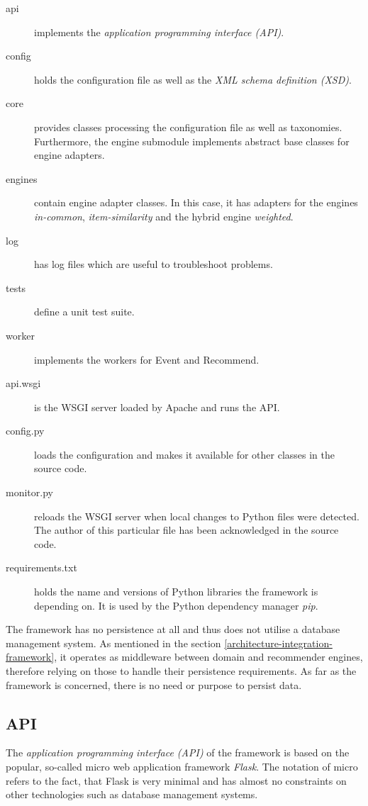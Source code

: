 \begin{description}
    \item[api] implements the \emph{application programming interface (API)}.
    \item[config] holds the configuration file as well as the \emph{XML schema definition (XSD)}.
    \item[core] provides classes processing the configuration file as well as taxonomies. Furthermore, the engine submodule implements abstract base classes for engine adapters.
    \item[engines] contain engine adapter classes. In this case, it has adapters for the engines \emph{in-common}, \emph{item-similarity} and the hybrid engine \emph{weighted}.
    \item[log] has log files which are useful to troubleshoot problems.
    \item[tests] define a unit test suite.
    \item[worker] implements the workers for Event and Recommend.
    \item[api.wsgi] is the WSGI server loaded by Apache and runs the API.
    \item[config.py] loads the configuration and makes it available for other classes in the source code.
    \item[monitor.py] reloads the WSGI server when local changes to Python files were detected. The author of this particular file has been acknowledged in the source code.
    \item[requirements.txt] holds the name and versions of Python libraries the framework is depending on. It is used by the Python dependency manager \emph{pip}.
\end{description}

The framework has no persistence at all and thus does not utilise a database management system. As mentioned in the section \ref{architecture-integration-framework}, it operates as middleware between domain and recommender engines, therefore relying on those to handle their persistence requirements. As far as the framework is concerned, there is no need or purpose to persist data.

\subsection{API}

The \emph{application programming interface (API)} of the framework is based on the popular, so-called micro web application framework \emph{Flask}. The notation of micro refers to the fact, that Flask is very minimal and has almost no constraints on other technologies such as database management systems.

